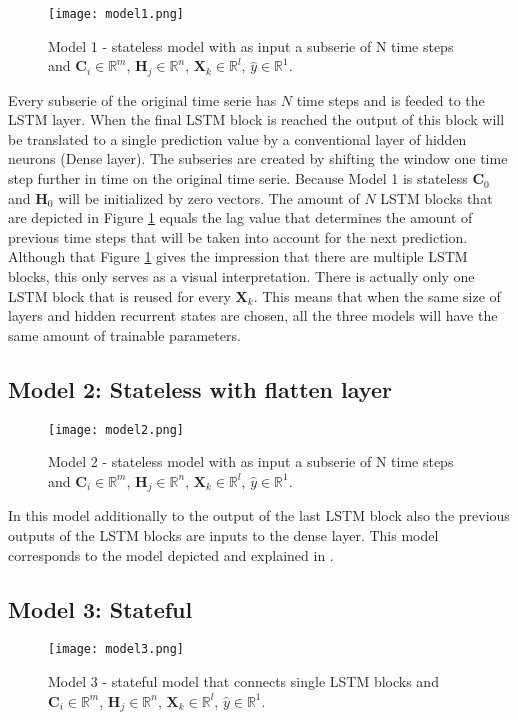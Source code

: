 \begin{figure}[h]
	\centering
	\texttt{[image: model1.png]}
	\caption{Model 1 - stateless model with as input a subserie of N time steps and $ \bm{C}_{i} \in \mathbb{R}^{m} $, $ \bm{H}_{j} \in \mathbb{R}^{n} $, $ \bm{X}_{k} \in \mathbb{R}^{l} $, $ \hat{y} \in \mathbb{R}^{1} $.}
	\label{fig:model1}
\end{figure}

Every subserie of the original time serie has $ N $ time steps and is feeded to the LSTM layer. When the final LSTM block is reached the output of this block will be translated to a single prediction value by a conventional layer of hidden neurons (Dense layer). The subseries are created by shifting the window one time step further in time on the original time serie. Because Model 1 is stateless $ \bm{C}_{0} $ and $ \bm{H}_{0} $ will be initialized by zero vectors. The amount of $ N $ LSTM blocks that are depicted in Figure \ref{fig:model1} equals the lag value that determines the amount of previous time steps that will be taken into account for the next prediction. Although that Figure \ref{fig:model1} gives the impression that there are multiple LSTM blocks, this only serves as a visual interpretation. There is actually only one LSTM block that is reused for every $ \bm{X}_{k} $. This means that when the same size of layers and hidden recurrent states are chosen, all the three models will have the same amount of trainable parameters. 


\subsection{Model 2: Stateless with flatten layer}\label{s:Model2}

\begin{figure}[ht]
	\centering
	\texttt{[image: model2.png]}
	\caption{Model 2 - stateless model with as input a subserie of N time steps and $ \bm{C}_{i} \in \mathbb{R}^{m} $, $ \bm{H}_{j} \in \mathbb{R}^{n} $, $ \bm{X}_{k} \in \mathbb{R}^{l} $, $ \hat{y} \in \mathbb{R}^{1} $.}
	\label{fig:model2}
\end{figure}

In this model additionally to the output of the last LSTM block also the previous outputs of the LSTM blocks are inputs to the dense layer. This model corresponds to the model depicted and explained in \cite{Kong2019}.

\subsection{Model 3: Stateful}\label{s:Model3}
\begin{figure}[ht]
	\centering
	\texttt{[image: model3.png]}
	\caption{Model 3 - stateful model that connects single LSTM blocks and $ \bm{C}_{i} \in \mathbb{R}^{m} $, $ \bm{H}_{j} \in \mathbb{R}^{n} $, $ \bm{X}_{k} \in \mathbb{R}^{l} $, $ \hat{y} \in \mathbb{R}^{1} $.}
	\label{fig:model3}
\end{figure}

